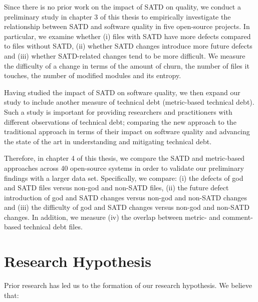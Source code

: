 Since there is no prior work on the impact of SATD on quality, we conduct a preliminary study in chapter 3 of this thesis to empirically investigate the relationship between SATD and software quality in five open-source projects. In particular, we examine whether (i) files with SATD have more defects compared to files without SATD, (ii) whether SATD changes introduce more future defects and (iii) whether SATD-related changes tend to be more difficult. We measure the difficulty of a change in terms of the amount of churn, the number of files it touches, the number of modified modules and its entropy. \par

Having studied the impact of SATD on software quality, we then expand our study to include another measure of technical debt (metric-based technical debt). Such a study is important for providing researchers and practitioners with different observations of technical debt; comparing the new approach to the traditional approach in terms of their impact on software quality and advancing the state of the art in understanding and mitigating technical debt.\par


Therefore, in chapter 4 of this thesis, we compare the SATD and metric-based approaches across 40 open-source systems in order to validate our preliminary findings with a larger data set. Specifically, we compare: (i) the defects of god and SATD files versus non-god and non-SATD files, (ii) the future defect introduction of god and SATD changes versus non-god and non-SATD changes and (iii) the difficulty of god and SATD changes versus non-god and non-SATD changes. In addition, we measure (iv) the overlap between metric- and comment-based technical debt files.

\iffalse
\section{Research Hypothesis}
Prior research has led us to the formation of our research hypothesis. We believe that:


